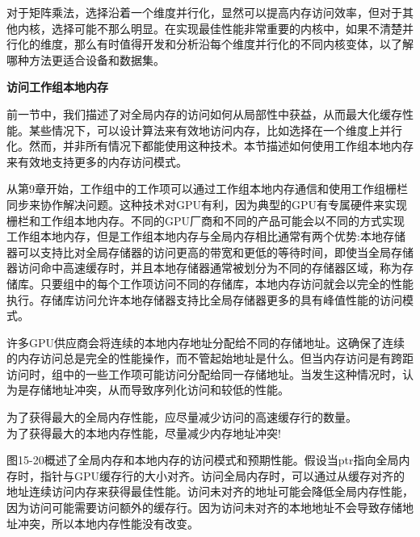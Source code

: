 \begin{tcolorbox}[colback=blue!5!white,colframe=blue!75!black, title=设置内核变体]
对于矩阵乘法，选择沿着一个维度并行化，显然可以提高内存访问效率，但对于其他内核，选择可能不那么明显。在实现最佳性能非常重要的内核中，如果不清楚并行化的维度，那么有时值得开发和分析沿每个维度并行化的不同内核变体，以了解哪种方法更适合设备和数据集。
\end{tcolorbox}

\hspace*{\fill} \par %
\textbf{访问工作组本地内存}

前一节中，我们描述了对全局内存的访问如何从局部性中获益，从而最大化缓存性能。某些情况下，可以设计算法来有效地访问内存，比如选择在一个维度上并行化。然而，并非所有情况下都能使用这种技术。本节描述如何使用工作组本地内存来有效地支持更多的内存访问模式。\par

从第9章开始，工作组中的工作项可以通过工作组本地内存通信和使用工作组栅栏同步来协作解决问题。这种技术对GPU有利，因为典型的GPU有专属硬件来实现栅栏和工作组本地内存。不同的GPU厂商和不同的产品可能会以不同的方式实现工作组本地内存，但是工作组本地内存与全局内存相比通常有两个优势:本地存储器可以支持比对全局存储器的访问更高的带宽和更低的等待时间，即使当全局存储器访问命中高速缓存时，并且本地存储器通常被划分为不同的存储器区域，称为存储库。只要组中的每个工作项访问不同的存储库，本地内存访问就会以完全的性能执行。存储库访问允许本地存储器支持比全局存储器更多的具有峰值性能的访问模式。\par

许多GPU供应商会将连续的本地内存地址分配给不同的存储地址。这确保了连续的内存访问总是完全的性能操作，而不管起始地址是什么。但当内存访问是有跨距访问时，组中的一些工作项可能访问分配给同一存储地址。当发生这种情况时，认为是存储地址冲突，从而导致序列化访问和较低的性能。\par

\begin{tcolorbox}[colback=red!5!white,colframe=red!75!black]
为了获得最大的全局内存性能，应尽量减少访问的高速缓存行的数量。\\

为了获得最大的本地内存性能，尽量减少内存地址冲突!
\end{tcolorbox}

图15-20概述了全局内存和本地内存的访问模式和预期性能。假设当ptr指向全局内存时，指针与GPU缓存行的大小对齐。访问全局内存时，可以通过从缓存对齐的地址连续访问内存来获得最佳性能。访问未对齐的地址可能会降低全局内存性能，因为访问可能需要访问额外的缓存行。因为访问未对齐的本地地址不会导致存储地址冲突，所以本地内存性能没有改变。\par


